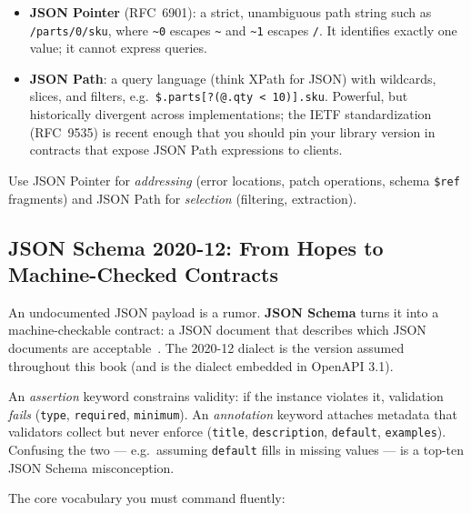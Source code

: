 \begin{itemize}
  \item \textbf{JSON Pointer} (RFC~6901): a strict, unambiguous path string such as
        \texttt{/parts/0/sku}, where \texttt{\textasciitilde0} escapes
        \texttt{\textasciitilde} and \texttt{\textasciitilde1} escapes \texttt{/}.
        It identifies exactly one value; it cannot express queries.
  \item \textbf{JSON Path}: a query language (think XPath for JSON) with wildcards,
        slices, and filters, e.g.\ \texttt{\$.parts[?(@.qty < 10)].sku}. Powerful,
        but historically divergent across implementations; the IETF standardization
        (RFC~9535) is recent enough that you should pin your library version in
        contracts that expose JSON Path expressions to clients.
\end{itemize}

Use JSON Pointer for \emph{addressing} (error locations, patch operations, schema
\texttt{\$ref} fragments) and JSON Path for \emph{selection} (filtering, extraction).

\subsection{JSON Schema 2020-12: From Hopes to Machine-Checked Contracts}
\label{sec:ch4-jsonschema}

An undocumented JSON payload is a rumor. \textbf{JSON Schema} turns it into a
machine-checkable contract: a JSON document that describes which JSON documents are
acceptable~\cite{jsonschemadocs}. The 2020-12 dialect is the version assumed
throughout this book (and is the dialect embedded in OpenAPI 3.1).

\begin{definition}
An \emph{assertion} keyword constrains validity: if the instance violates it,
validation \emph{fails} (\texttt{type}, \texttt{required}, \texttt{minimum}). An
\emph{annotation} keyword attaches metadata that validators collect but never
enforce (\texttt{title}, \texttt{description}, \texttt{default}, \texttt{examples}).
Confusing the two --- e.g.\ assuming \texttt{default} fills in missing values --- is
a top-ten JSON Schema misconception.
\end{definition}

The core vocabulary you must command fluently:

